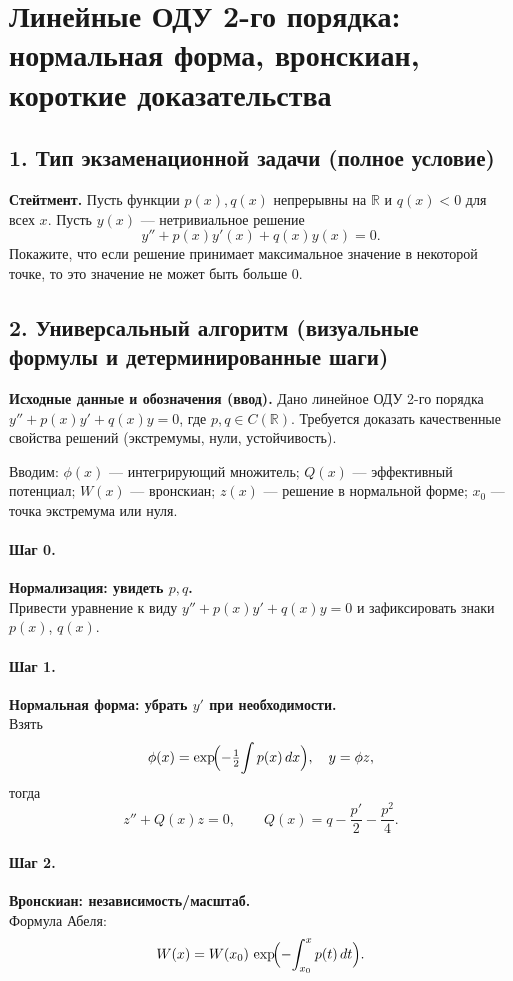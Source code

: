 \section{Линейные ОДУ 2-го порядка: нормальная форма, вронскиан, короткие доказательства}

\subsection*{1. Тип экзаменационной задачи (полное условие)}
\textbf{Стейтмент.}
Пусть функции \(p(x),q(x)\) непрерывны на \(\mathbb R\) и \(q(x)<0\) для всех \(x\).
Пусть \(y(x)\) — нетривиальное решение
\[
y''+p(x)y'(x)+q(x)y(x)=0.
\]
Покажите, что если решение принимает максимальное значение в некоторой точке, то это значение не может быть больше \(0\).

\subsection*{2. Универсальный алгоритм (визуальные формулы и детерминированные шаги)}

\textbf{Исходные данные и обозначения (ввод).} Дано линейное ОДУ 2-го порядка \(y''+p(x)y'+q(x)y=0\), где \(p,q\in C(\mathbb{R})\). Требуется доказать качественные свойства решений (экстремумы, нули, устойчивость).

Вводим: \(\phi(x)\) — интегрирующий множитель; \(Q(x)\) — эффективный потенциал; \(W(x)\) — вронскиан; \(z(x)\) — решение в нормальной форме; \(x_0\) — точка экстремума или нуля.

\paragraph{Шаг 0.} \textbf{Нормализация: увидеть \(p,q\).}\\
Привести уравнение к виду \(y''+p(x)y'+q(x)y=0\) и зафиксировать знаки \(p(x)\), \(q(x)\).

\paragraph{Шаг 1.} \textbf{Нормальная форма: убрать \(y'\) при необходимости.}\\
Взять
\[
\phi(x)=\exp\!\Bigl(-\tfrac12\!\int p(x)\,dx\Bigr),\quad y=\phi z,
\]
тогда
\[
z''+Q(x)z=0,\qquad Q(x)=q-\frac{p'}{2}-\frac{p^2}{4}.
\]

\paragraph{Шаг 2.} \textbf{Вронскиан: независимость/масштаб.}\\
Формула Абеля:
\[
W(x)=W(x_0)\,\exp\!\Bigl(-\!\int_{x_0}^{x}p(t)\,dt\Bigr).
\]

